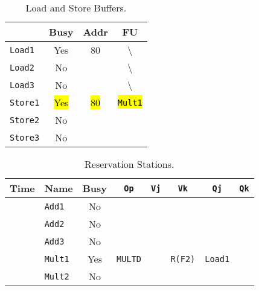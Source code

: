 \begin{enumerate}
    \begin{table}[!htp]
        \centering
        \begin{tabular}{@{} l | c c c @{}}
            \toprule
                                & Busy      & Addr      & FU   \\
            \midrule
            \texttt{Load1}      & Yes       & 80        & \textbackslash        \\ [.3em]
            \texttt{Load2}      & No        &           & \textbackslash        \\ [.3em]
            \texttt{Load3}      & No        &           & \textbackslash        \\
            \cmidrule{1-4}
            \texttt{Store1}     & \hl{Yes}  & \hl{80}   & \hl{\texttt{Mult1}}   \\ [.3em]
            \texttt{Store2}     & No        &           &                       \\ [.3em]
            \texttt{Store3}     & No        &           &                       \\
            \bottomrule
        \end{tabular}
        \caption*{Load and Store Buffers.}
    \end{table}

    \begin{table}[!htp]
        \centering
        \begin{tabular}{@{} l l | c c c c c c @{}}
            \toprule
            Time        & Name              & Busy      & \texttt{Op}           & \texttt{Vj}       & \texttt{Vk}           & \texttt{Qj}           & \texttt{Qk}       \\
            \midrule
                        & \texttt{Add1}     & No        &                       &                   &                       &                       &                   \\ [.3em]
                        & \texttt{Add2}     & No        &                       &                   &                       &                       &                   \\ [.3em]
                        & \texttt{Add3}     & No        &                       &                   &                       &                       &                   \\ [.3em]
                        & \texttt{Mult1}    & Yes       & \texttt{MULTD}        &                   & \texttt{R(F2)}        & \texttt{Load1}        &                   \\ [.3em]
                        & \texttt{Mult2}    & No        &                       &                   &                       &                       &                   \\
            \bottomrule
        \end{tabular}
        \caption*{Reservation Stations.}
    \end{table}


\end{enumerate}
